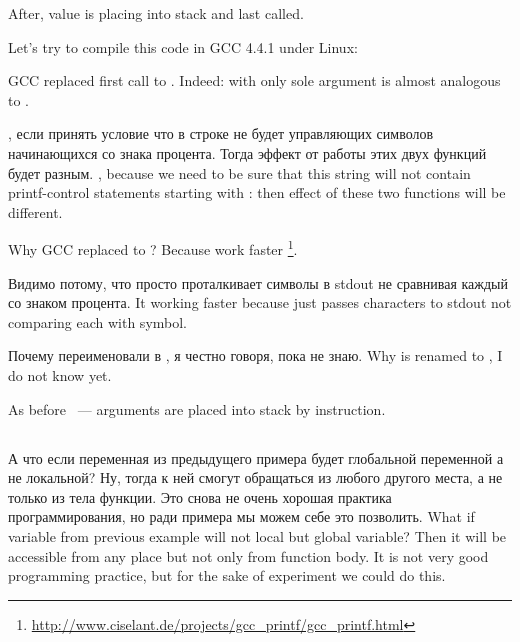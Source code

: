 {After, \ECX value is placing into stack and last \printf called.}

{Let's try to compile this code in GCC 4.4.1 under Linux:}



\label{puts}
{GCC replaced first \printf call to . 
Indeed: \printf with only sole argument is almost analogous to .} 

\IFRU
{, если принять условие что в строке не будет управляющих символов \printf 
начинающихся со знака процента. Тогда эффект от работы этих двух функций будет разным.}
{, because we need to be sure that this string will not contain printf-control 
statements starting with \IT{\%}: then effect of these two functions will be different.}

{Why GCC replaced \printf to ? Because  work faster}
\footnote{\url{http://www.ciselant.de/projects/gcc_printf/gcc_printf.html}}. 

\IFRU
{Видимо потому, что просто проталкивает символы в stdout не сравнивая каждый со знаком процента.}
{It working faster because just passes characters to stdout not comparing each with \IT{\%} symbol.}

\IFRU
{Почему \scanf переименовали в , я честно говоря, пока не знаю.}
{Why \scanf is renamed to , I do not know yet.}

{As before ~--- arguments are placed into stack by \MOV instruction.}

\subsection{}

\IFRU
{А что если переменная  из предыдущего примера будет глобальной переменной а не локальной? 
Ну, тогда к ней смогут обращаться из любого другого места, а не только из тела функции. 
Это снова не очень хорошая практика программирования, но ради примера мы можем себе это позволить.}
{What if  variable from previous example will not local but global variable? 
Then it will be accessible from any place but not only from function body. 
It is not very good programming practice, but for the sake of experiment we could do this.}

